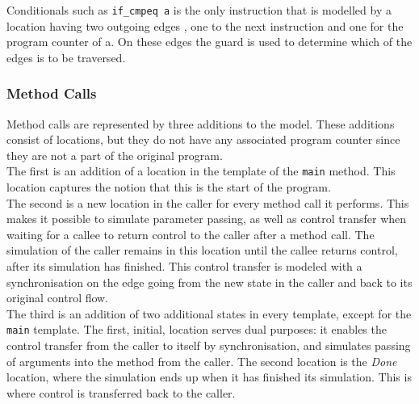 Conditionals such as \texttt{if\_cmpeq a} is the only instruction that is modelled by a location having two outgoing edges , one to the next instruction and one for the program counter of a. On these edges the guard is used to determine which of the edges is to be traversed. 
\subsubsection{Method Calls}\label{subsubsec:method}
Method calls are represented by three additions to the model. These additions consist of locations, but they do not have any associated program counter since they are not a part of the original program.\\

The first is an addition of a location in the template of the \texttt{main} method. This location captures the notion that this is the start of the program.\\

The second is a new location in the caller for every method call it performs. This makes it possible to simulate parameter passing, as well as control transfer when waiting for a callee to return control to the caller after a method call. The simulation of the caller remains in this location until the callee returns control, after its simulation has finished. This control transfer is modeled with a synchronisation on the edge going from the new state in the caller and back to its original control flow.~\\

The third is an addition of two additional states in every template, except for the \texttt{main} template. The first, initial, location serves dual purposes: it enables the control transfer from the caller to itself by synchronisation, and simulates passing of arguments into the method from the caller. The second location is the \textit{Done} location, where the simulation ends up when it has finished its simulation. This is where control is transferred back to the caller.

